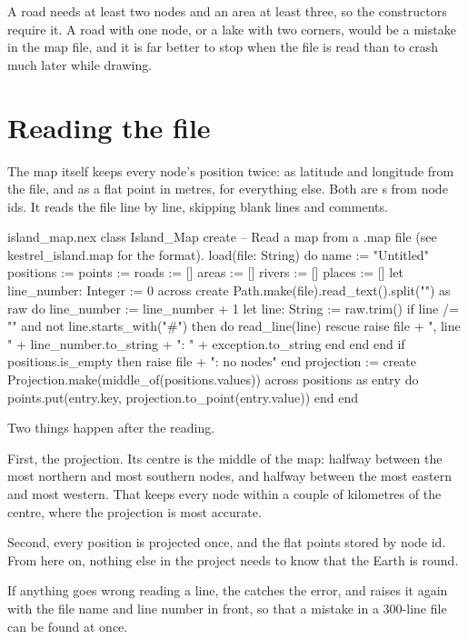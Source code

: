 A road needs at least two nodes and an area at least three, so the
constructors require it. A road with one node, or a lake with two corners,
would be a mistake in the map file, and it is far better to stop when the
file is read than to crash much later while drawing.

\section{Reading the file}

The map itself keeps every node's position twice: as latitude and longitude
from the file, and as a flat point in metres, for everything else. Both are
s from node ids. It reads the file line by line, skipping blank
lines and comments.

\begin{append}{island_map.nex}
class Island_Map
create
  -- Read a map from a .map file (see kestrel_island.map for the format).
  load(file: String) do
    name := "Untitled"
    positions := {}
    points := {}
    roads := []
    areas := []
    rivers := []
    places := []
    let line_number: Integer := 0
    across create Path.make(file).read_text().split("\n") as raw do
      line_number := line_number + 1
      let line: String := raw.trim()
      if line /= "" and not line.starts_with("#") then
        do
          read_line(line)
        rescue
          raise file + ", line " + line_number.to_string + ": " + exception.to_string
        end
      end
    end
    if positions.is_empty then
      raise file + ": no nodes"
    end
    projection := create Projection.make(middle_of(positions.values))
    across positions as entry do
      points.put(entry.key, projection.to_point(entry.value))
    end
  end
\end{append}

Two things happen after the reading.

First, the projection. Its centre is the middle of the map: halfway
between the most northern and most southern nodes, and halfway between
the most eastern and most western. That keeps every node within a couple
of kilometres of the centre, where the projection is most accurate.

Second, every position is projected once, and the flat points stored by
node id. From here on, nothing else in the project needs to know that the
Earth is round.

If anything goes wrong reading a line, the  catches the
error, and raises it again with the file name and line number in front, so
that a mistake in a 300-line file can be found at once.


